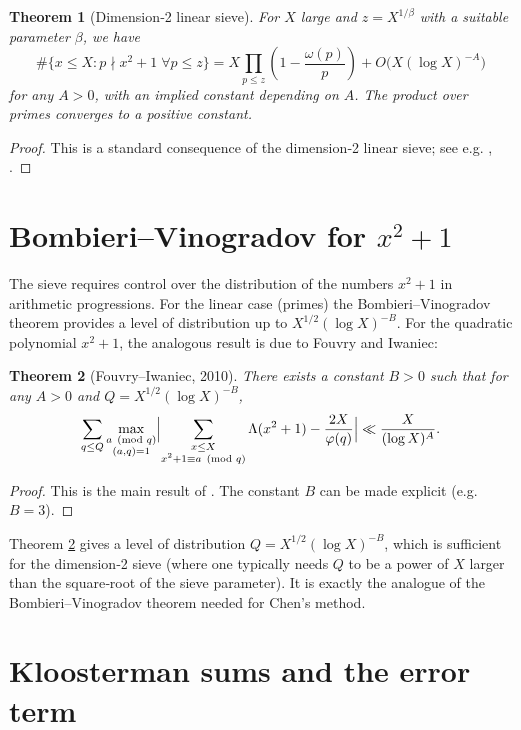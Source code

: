 \documentclass[11pt,a4paper]{article}
\newtheorem{theorem}{Theorem}[section]
\begin{document}
\begin{theorem}[Dimension‑2 linear sieve]
\label{thm:sieve}
For \(X\) large and \(z = X^{1/\beta}\) with a suitable parameter \(\beta\), we have
\[
\#\{ x\le X : p\nmid x^{2}+1 \;\forall p\le z \} = X \prod_{p\le z}\left(1-\frac{\omega(p)}{p}\right) + O\bigl(X (\log X)^{-A}\bigr)
\]
for any \(A>0\), with an implied constant depending on \(A\). The product over primes converges to a positive constant.
\end{theorem}
\begin{proof}
This is a standard consequence of the dimension‑2 linear sieve; see e.g. \cite{iwaniec1978}, \cite{halberstam-richert}.
\end{proof}

\section{Bombieri–Vinogradov for \(x^{2}+1\)}

The sieve requires control over the distribution of the numbers \(x^{2}+1\) in arithmetic progressions. For the linear case (primes) the Bombieri–Vinogradov theorem provides a level of distribution up to \(X^{1/2}(\log X)^{-B}\). For the quadratic polynomial \(x^{2}+1\), the analogous result is due to Fouvry and Iwaniec:

\begin{theorem}[Fouvry–Iwaniec, 2010]
\label{thm:bombieri}
There exists a constant \(B>0\) such that for any \(A>0\) and \(Q = X^{1/2}(\log X)^{-B}\),
\[
\sum_{q\le Q} \max_{\substack{a\pmod q \\ (a,q)=1}} \Bigl|
\sum_{\substack{x\le X \\ x^{2}+1\equiv a\pmod q}} \Lambda(x^{2}+1) - \frac{2X}{\varphi(q)} \Bigr|
\ll \frac{X}{(\log X)^{A}}.
\]
\end{theorem}
\begin{proof}
This is the main result of \cite{fouvry-iwaniec2010}. The constant \(B\) can be made explicit (e.g. \(B=3\)).
\end{proof}

Theorem \ref{thm:bombieri} gives a level of distribution \(Q = X^{1/2}(\log X)^{-B}\), which is sufficient for the dimension‑2 sieve (where one typically needs \(Q\) to be a power of \(X\) larger than the square‑root of the sieve parameter). It is exactly the analogue of the Bombieri–Vinogradov theorem needed for Chen's method.

\section{Kloosterman sums and the error term}
\end{document}
